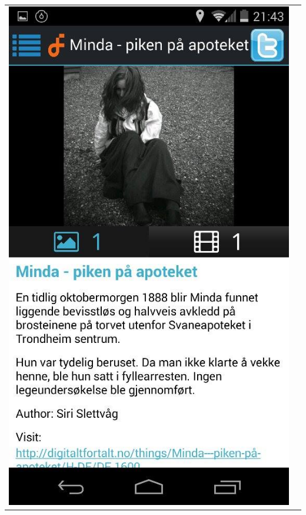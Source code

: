 \documentclass[12pt,a4paper,titlepage]{article}
\begin{document}
\begin{appendices}
\begin{center}
\begin{tabular}{cc}
	 	\includegraphics[width=0.35 \textwidth]{res/ScreenShot4.jpg}\\
\end{tabular}
\end{center}


\end{appendices}
\end{document}
